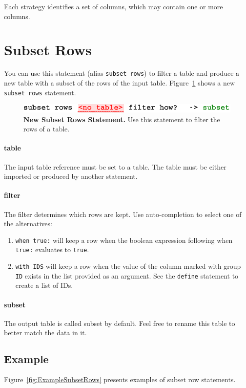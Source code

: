 \noindent{}Each strategy identifies a set of columns, which may contain one or more columns.

\section{Subset Rows}
You can use this statement (alias \texttt{subset rows}) to filter a table and produce a new table with a subset of the rows of the input table. Figure~\ref{fig:NewSubsetRows} shows a new \texttt{subset rows} statement.

\begin{figure}
  \centering
  \includegraphics[width=\figWidthNarrow]{figures/NewSubsetRowsStatement.pdf}
\caption[New Subset Rows Statement.]{\textbf{New Subset Rows Statement.} Use this statement to filter the rows of a table.}
\label{fig:NewSubsetRows}
\end{figure}

\paragraph{table}
The input table reference must be set to a table. The table must be either imported or produced by another statement.
\paragraph{filter}
The filter determines which rows are kept. Use auto-completion to select one of the alternatives:
\begin{enumerate}
	\item \texttt{when true:} will keep a row when the boolean expression following when \texttt{true:} evaluates to  \texttt{true}.
	\item \texttt{with IDS} will keep a row when the value of the column marked with group \texttt{ID} exists in the list provided as an argument. See the \texttt{define} statement to create a list of IDs. 
\end{enumerate}

\paragraph{subset}
The output table is called subset by default. Feel free to rename this table to better match the data in it.

\subsection{Example}
Figure~\ref{fig:ExampleSubsetRows} presents examples of subset row statements. 

